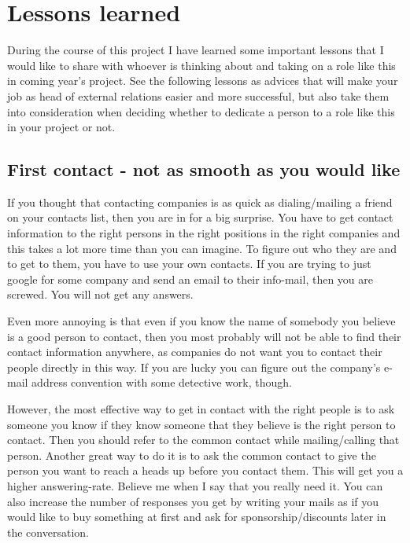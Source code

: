 \section{Lessons learned}\label{sec:lessons_learned}
During the course of this project I have learned some important lessons that I would like to share with whoever is thinking about and taking on a role like this in coming year's project. See the following lessons as advices that will make your job as head of external relations easier and more successful, but also take them into consideration when deciding whether to dedicate a person to a role like this in your project or not.

\subsection{First contact - not as smooth as you would like}
If you thought that contacting companies is as quick as dialing/mailing a friend on your contacts list, then you are in for a big surprise. You have to get contact information to the right persons in the right positions in the right companies and this takes a lot more time than you can imagine. To figure out who they are and to get to them, you have to use your own contacts. If you are trying to just google for some company and send an email to their info-mail, then you are screwed. You will not get any answers. 

\pagebreak
Even more annoying is that even if you know the name of somebody you believe is a good person to contact, then you most probably will not be able to find their contact information anywhere, as companies do not want you to contact their people directly in this way. If you are lucky you can figure out the company's e-mail address convention with some detective work, though. 

However, the most effective way to get in contact with the right people is to ask someone you know if they know someone that they believe is the right person to contact. Then you should refer to the common contact while mailing/calling that person. Another great way to do it is to ask the common contact to give the person you want to reach a heads up before you contact them. This will get you a higher answering-rate. Believe me when I say that you really need it. You can also increase the number of responses you get by writing your mails as if you would like to buy something at first and ask for sponsorship/discounts later in the conversation. 

